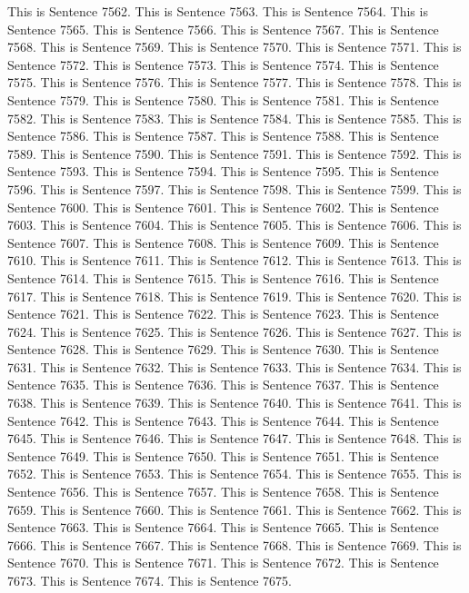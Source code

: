\documentclass{article}
\begin{document}
This is Sentence 7562.
This is Sentence 7563.
This is Sentence 7564.
This is Sentence 7565.
This is Sentence 7566.
This is Sentence 7567.
This is Sentence 7568.
This is Sentence 7569.
This is Sentence 7570.
This is Sentence 7571.
This is Sentence 7572.
This is Sentence 7573.
This is Sentence 7574.
This is Sentence 7575.
This is Sentence 7576.
This is Sentence 7577.
This is Sentence 7578.
This is Sentence 7579.
This is Sentence 7580.
This is Sentence 7581.
This is Sentence 7582.
This is Sentence 7583.
This is Sentence 7584.
This is Sentence 7585.
This is Sentence 7586.
This is Sentence 7587.
This is Sentence 7588.
This is Sentence 7589.
This is Sentence 7590.
This is Sentence 7591.
This is Sentence 7592.
This is Sentence 7593.
This is Sentence 7594.
This is Sentence 7595.
This is Sentence 7596.
This is Sentence 7597.
This is Sentence 7598.
This is Sentence 7599.
This is Sentence 7600.
This is Sentence 7601.
This is Sentence 7602.
This is Sentence 7603.
This is Sentence 7604.
This is Sentence 7605.
This is Sentence 7606.
This is Sentence 7607.
This is Sentence 7608.
This is Sentence 7609.
This is Sentence 7610.
This is Sentence 7611.
This is Sentence 7612.
This is Sentence 7613.
This is Sentence 7614.
This is Sentence 7615.
This is Sentence 7616.
This is Sentence 7617.
This is Sentence 7618.
This is Sentence 7619.
This is Sentence 7620.
This is Sentence 7621.
This is Sentence 7622.
This is Sentence 7623.
This is Sentence 7624.
This is Sentence 7625.
This is Sentence 7626.
This is Sentence 7627.
This is Sentence 7628.
This is Sentence 7629.
This is Sentence 7630.
This is Sentence 7631.
This is Sentence 7632.
This is Sentence 7633.
This is Sentence 7634.
This is Sentence 7635.
This is Sentence 7636.
This is Sentence 7637.
This is Sentence 7638.
This is Sentence 7639.
This is Sentence 7640.
This is Sentence 7641.
This is Sentence 7642.
This is Sentence 7643.
This is Sentence 7644.
This is Sentence 7645.
This is Sentence 7646.
This is Sentence 7647.
This is Sentence 7648.
This is Sentence 7649.
This is Sentence 7650.
This is Sentence 7651.
This is Sentence 7652.
This is Sentence 7653.
This is Sentence 7654.
This is Sentence 7655.
This is Sentence 7656.
This is Sentence 7657.
This is Sentence 7658.
This is Sentence 7659.
This is Sentence 7660.
This is Sentence 7661.
This is Sentence 7662.
This is Sentence 7663.
This is Sentence 7664.
This is Sentence 7665.
This is Sentence 7666.
This is Sentence 7667.
This is Sentence 7668.
This is Sentence 7669.
This is Sentence 7670.
This is Sentence 7671.
This is Sentence 7672.
This is Sentence 7673.
This is Sentence 7674.
This is Sentence 7675.
\end{document}
